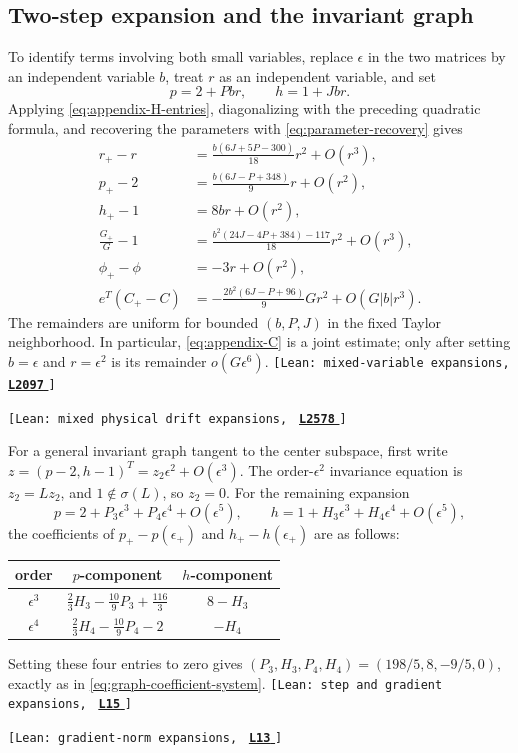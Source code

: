 \documentclass[11pt]{article}
\newcommand{\leanLinkText}[1]{%
  \underline{\textbf{#1}}%
}
\newcommand{\leanSnapshot}{e308927f5b7930bdd002f0c0e42b9d112ad821cb}
\newcommand{\leanClaimTag}[3]{%
  {\footnotesize\texttt{[Lean: #1, }}%
  \href{https://github.com/imathwy/DFP_wolfe_local/blob/\leanSnapshot/#2?plain=1\#L#3}%
    {\leanLinkText{\footnotesize\texttt{L#3}}}%
  {\footnotesize\texttt{]}}\enspace
}
\begin{document}
\subsection{Two-step expansion and the invariant graph}

To identify terms involving both small variables, replace $\epsilon$ in the
two matrices by an independent variable $b$, treat $r$ as an independent
variable, and set
\[
p=2+Pbr,\qquad h=1+Jbr.
\]
Applying \eqref{eq:appendix-H-entries}, diagonalizing with the preceding
quadratic formula, and recovering the parameters with
\eqref{eq:parameter-recovery} gives
\begin{align}
r_+-r
 &=\frac{b(6J+5P-300)}{18}r^2+O(r^3),
\label{eq:appendix-r}\\
p_+-2
 &=\frac{b(6J-P+348)}9r+O(r^2),
\label{eq:appendix-p}\\
h_+-1&=8br+O(r^2),
\label{eq:appendix-h}\\
\frac{G_+}{G}-1
 &=\frac{b^2(24J-4P+384)-117}{18}r^2+O(r^3),
\label{eq:appendix-G}\\
\phi_+-\phi&=-3r+O(r^2),
\label{eq:appendix-phi}\\
e^T(C_+-C)
 &=-\frac{2b^2(6J-P+96)}9Gr^2+O(G|b|r^3).
\label{eq:appendix-C}
\end{align}
The remainders are uniform for bounded $(b,P,J)$ in the fixed Taylor
neighborhood.  In particular, \eqref{eq:appendix-C} is a joint estimate; only
after setting $b=\epsilon$ and $r=\epsilon^2$ is its remainder
$o(G\epsilon^6)$.
\leanClaimTag{mixed-variable expansions}{ReasLib/Optimization/DFP/TwoPhaseControls/MixedExpansion.lean}{2097}
\leanClaimTag{mixed physical drift expansions}{ReasLib/Optimization/DFP/TwoPhaseControls/PhysicalDrift.lean}{2578}

For a general invariant graph tangent to the center subspace, first write
$z=(p-2,h-1)^T=z_2\epsilon^2+O(\epsilon^3)$.  The order-$\epsilon^2$
invariance equation is $z_2=Lz_2$, and $1\notin\sigma(L)$, so $z_2=0$.
For the remaining expansion
\[
p=2+P_3\epsilon^3+P_4\epsilon^4+O(\epsilon^5),\qquad
h=1+H_3\epsilon^3+H_4\epsilon^4+O(\epsilon^5),
\]
the coefficients of $p_+-p(\epsilon_+)$ and
$h_+-h(\epsilon_+)$ are as follows:
\begin{center}
\begin{tabular}{c@{\qquad}c@{\qquad}c}
\toprule
order & $p$-component & $h$-component\\
\midrule
$\epsilon^3$ & $\frac23H_3-\frac{10}{9}P_3+\frac{116}{3}$
              & $8-H_3$\\[2pt]
$\epsilon^4$ & $\frac23H_4-\frac{10}{9}P_4-2$
              & $-H_4$\\
\bottomrule
\end{tabular}
\end{center}
Setting these four entries to zero gives
$(P_3,H_3,P_4,H_4)=(198/5,8,-9/5,0)$, exactly as in
\eqref{eq:graph-coefficient-system}.
\leanClaimTag{step and gradient expansions}{DFPWolfe/A_uniformly_convex_counterexample_to_global_convergence_of_DFP_under_weak_Wolfe_/Appendix_Lemma_A_11_Step_norm_expansions.lean}{15}
\leanClaimTag{gradient-norm expansions}{DFPWolfe/A_uniformly_convex_counterexample_to_global_convergence_of_DFP_under_weak_Wolfe_/Appendix_Lemma_A_12_Gradient_norm_expansions.lean}{13}
\end{document}
